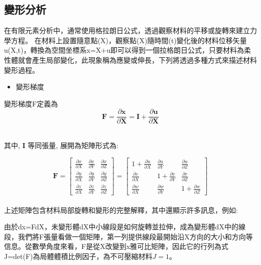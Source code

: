 \subsection{變形分析}

在有限元素分析中，通常使用格拉朗日公式，透過觀察材料的平移或旋轉來建立力學方程。
在材料上設置隨意點(X)，觀察點(X)隨時間(t)變化後的材料位移矢量u(X,t)，轉換為空間坐標系x=X+u即可以得到一個拉格朗日公式，只要材料為柔性體就會產生局部變化，此現象稱為應變或伸長，下列將透過多種方式來描述材料變形過程。\\

\begin{itemize}
\item 變形梯度
\end{itemize}

變形梯度F定義為
$$\mathbf{F}=\frac{\partial \mathbf{x}}{\partial \mathbf{X}}=\mathbf{I}+\frac{\partial \mathbf{u}}{\partial \mathbf{X}}$$\

其中, $\mathbf{I}$ 等同張量, 展開為矩陣形式為:\

$$\mathbf{F}=\left[\begin{array}{lll}
\frac{\partial x}{\partial X} & \frac{\partial x}{\partial Y} & \frac{\partial x}{\partial Z} \\
\frac{\partial y}{\partial X} & \frac{\partial y}{\partial Y} & \frac{\partial y}{\partial Z} \\
\frac{\partial z}{\partial X} & \frac{\partial z}{\partial Y} & \frac{\partial z}{\partial Z}
\end{array}\right]=\left[\begin{array}{ccc}
1+\frac{\partial u}{\partial X} & \frac{\partial u}{\partial Y} & \frac{\partial u}{\partial Z} \\
\frac{\partial v}{\partial X} & 1+\frac{\partial v}{\partial Y} & \frac{\partial v}{\partial Z} \\
\frac{\partial w}{\partial X} & \frac{\partial w}{\partial Y} & 1+\frac{\partial w}{\partial Z}
\end{array}\right]$$
\\

上述矩陣包含材料局部旋轉和變形的完整解釋，其中還顯示許多訊息，例如:\

由於dx=FdX，未變形體dX中小線段是如何旋轉並拉伸，成為變形體dX中的線段，我們將F張量看做一個矩陣，第一列提供線段最開始沿X方向的大小和方向等信息。從數學角度來看，F是從X改變到x雅可比矩陣，因此它的行列為式J=det(F)為局體體積比例因子，為不可壓縮材料$J=1$。\\

